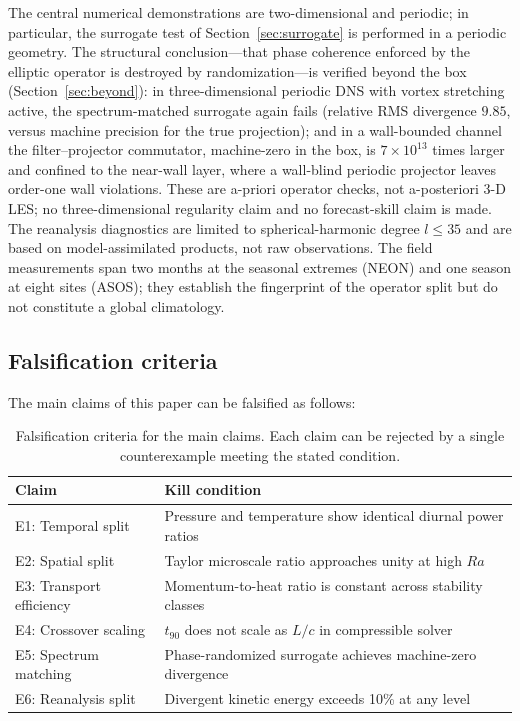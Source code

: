 \documentclass[11pt]{article}
\begin{document}
The central numerical demonstrations are two-dimensional and periodic; in particular, the surrogate test of Section~\ref{sec:surrogate} is performed in a periodic geometry. The structural conclusion---that phase coherence enforced by the elliptic operator is destroyed by randomization---is verified beyond the box (Section~\ref{sec:beyond}): in three-dimensional periodic DNS with vortex stretching active, the spectrum-matched surrogate again fails (relative RMS divergence $9.85$, versus machine precision for the true projection); and in a wall-bounded channel the filter--projector commutator, machine-zero in the box, is $7\times10^{13}$ times larger and confined to the near-wall layer, where a wall-blind periodic projector leaves order-one wall violations. These are a-priori operator checks, not a-posteriori 3-D LES; no three-dimensional regularity claim and no forecast-skill claim is made. The reanalysis diagnostics are limited to spherical-harmonic degree $l \leq 35$ and are based on model-assimilated products, not raw observations. The field measurements span two months at the seasonal extremes (NEON) and one season at eight sites (ASOS); they establish the fingerprint of the operator split but do not constitute a global climatology.

\subsection{Falsification criteria}

The main claims of this paper can be falsified as follows:

\begin{table}[t]
\centering
\caption{Falsification criteria for the main claims. Each claim can be rejected by a single counterexample meeting the stated condition.}
\label{tab:kill}
\begin{tabular}{ll}
\toprule
Claim & Kill condition \\
\midrule
E1: Temporal split & Pressure and temperature show identical diurnal power ratios \\
E2: Spatial split & Taylor microscale ratio approaches unity at high $Ra$ \\
E3: Transport efficiency & Momentum-to-heat ratio is constant across stability classes \\
E4: Crossover scaling & $t_{90}$ does not scale as $L/c$ in compressible solver \\
E5: Spectrum matching & Phase-randomized surrogate achieves machine-zero divergence \\
E6: Reanalysis split & Divergent kinetic energy exceeds 10\% at any level \\
\bottomrule
\end{tabular}
\end{table}
\end{document}
